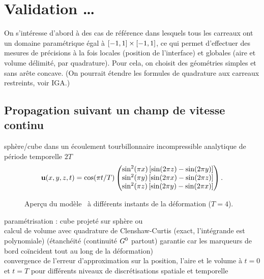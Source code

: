 \chapter{Validation \ldots}

On s'intéresse d'abord à des cas de référence dans lesquels tous les carreaux ont un domaine paramétrique égal à $\left[ -1, 1 \right] \times \left[ -1, 1 \right]$, ce qui permet d'effectuer des mesures de précisions à la fois locales (position de l'interface) et globales (aire et volume délimité, par quadrature). 
Pour cela, on choisit des géométries simples et sans arête concave.
(On pourrait étendre les formules de quadrature aux carreaux restreints, voir IGA.)

\section{Propagation suivant un champ de vitesse continu}

sphère/cube dans un écoulement tourbillonnaire incompressible analytique de période temporelle $2T$
\begin{equation}
	\mathbf{u}(x,y,z,t) = 
	\cos( \pi t/T )
	\begin{pmatrix} 
	\sin^2(\pi x) \left[ \sin(2\pi z) - \sin(2\pi y)\right] \\
\sin^2(\pi y) \left[ \sin(2\pi x) - \sin(2\pi z)\right] \\
\sin^2(\pi z) \left[ \sin(2\pi y) - \sin(2\pi x)\right]
	 \end{pmatrix}.
\end{equation}

\begin{figure}
	\centering
	
	\caption{Aperçu du modèle \brep\ à différents instants de la déformation ($T=4$).}
	\label{fig:snapshots_vortex}
\end{figure}

paramétrisation : cube projeté sur sphère ou \\
calcul de volume avec quadrature de Clenshaw-Curtis (exact, l'intégrande est polynomiale) (étanchéité (continuité $G^{0}$ partout) garantie car les marqueurs de bord coïncident tout au long de la déformation)\\
convergence de l'erreur d'approximation sur la position, l'aire et le volume à $t = 0$ et $t = T$ pour différents niveaux de discrétisations spatiale et temporelle\\

\def\axw{0.48\textwidth}
\def\axh{0.39\textwidth}
\def\xlabl{$N$}%
\def\ylabl{Erreur}
\def\xsep{2pt}

